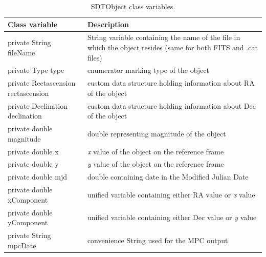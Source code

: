 \begin{table}[H]
\centering
\setlength{\extrarowheight}{2pt}
\begin{tabularx}{\textwidth}{|X|X|}
\hline
\textbf{Class variable} & \textbf{Description} \\ \hline
private String \mbox{fileName} & String variable containing the name of the file in which the object resides (same for both FITS and .cat files) \\ \hline
private Type \mbox{type} & enumerator marking type of the object \\ \hline
private \mbox{Rectascension} \mbox{rectascension} & custom data structure holding information about RA of the object \\ \hline
private \mbox{Declination} \mbox{declination} & custom data structure holding information about Dec of the object \\ \hline
private double \mbox{magnitude} & double representing magnitude of the object \\ \hline
private double \mbox{x} & \emph{x} value of the object on the reference frame \\ \hline
private double \mbox{y} & \emph{y} value of the object on the reference frame \\ \hline
private double \mbox{mjd} & double containing date in the Modified Julian Date \\ \hline
private double \mbox{xComponent} & unified variable containing either RA value or \emph{x} value \\ \hline
private double \mbox{yComponent} & unified variable containing either Dec value or \emph{y} value \\ \hline
private String mpcDate & convenience String used for the MPC output \\ \hline
\end{tabularx}
\caption{SDTObject class variables.}
\label{tab:class_variables_O}
\end{table}

